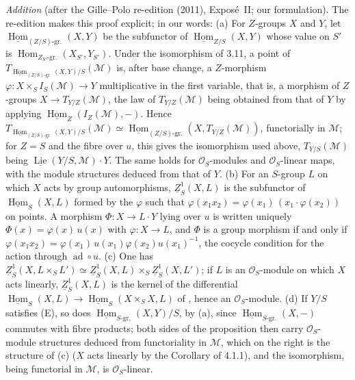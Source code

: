 \par\medskip\noindent
\emph{Addition} (after the Gille--Polo re-edition (2011), Expos\'e~II; our
formulation). The re-edition makes this proof explicit; in our words:
(a) For \(Z\)-groups \(X\) and \(Y\), let
\(\underline{\operatorname{Hom}}_{(Z/S)\text{-gr.}}(X,Y)\) be the subfunctor
of \(\underline{\operatorname{Hom}}_{Z/S}(X,Y)\) whose value on \(S'\) is
\(\operatorname{Hom}_{Z_{S'}\text{-gr.}}(X_{S'},Y_{S'})\). Under the
isomorphism of 3.11, a point of
\(T_{\underline{\operatorname{Hom}}_{(Z/S)\text{-gr.}}(X,Y)/S}(\mathcal M)\)
is, after base change, a \(Z\)-morphism
\(\varphi\colon X\times_SI_S(\mathcal M)\to Y\) multiplicative in the first
variable, that is, a morphism of \(Z\)-groups \(X\to T_{Y/Z}(\mathcal M)\),
the law of \(T_{Y/Z}(\mathcal M)\) being obtained from that of \(Y\) by
applying \(\underline{\operatorname{Hom}}_Z(I_Z(\mathcal M),-)\). Hence
\(T_{\underline{\operatorname{Hom}}_{(Z/S)\text{-gr.}}(X,Y)/S}(\mathcal M)
\simeq\underline{\operatorname{Hom}}_{(Z/S)\text{-gr.}}(X,T_{Y/Z}(\mathcal M))\),
functorially in \(\mathcal M\); for \(Z=S\) and the fibre over \(u\), this
gives the isomorphism used above, \(T_{Y/S}(\mathcal M)\) being
\(\underline{\operatorname{Lie}}(Y/S,\mathcal M)\cdot Y\). The same holds for
\(\mathcal O_S\)-modules and \(\mathcal O_S\)-linear maps, with the module
structures deduced from that of \(Y\). (b) For an \(S\)-group \(L\) on
which \(X\) acts by group automorphisms, \(\underline Z^1_S(X,L)\) is the
subfunctor of \(\underline{\operatorname{Hom}}_S(X,L)\) formed by the
\(\varphi\) such that \(\varphi(x_1x_2)=\varphi(x_1)\,(x_1\cdot\varphi(x_2))\)
on points. A morphism \(\Phi\colon X\to L\cdot Y\) lying over \(u\) is
written uniquely \(\Phi(x)=\varphi(x)\,u(x)\) with \(\varphi\colon X\to L\),
and \(\Phi\) is a group morphism if and only if
\(\varphi(x_1x_2)=\varphi(x_1)\,u(x_1)\varphi(x_2)u(x_1)^{-1}\), the cocycle
condition for the action through \(\operatorname{ad}\circ u\). (c) One has
\(\underline Z^1_S(X,L\times_SL')\simeq\underline Z^1_S(X,L)\times_S
\underline Z^1_S(X,L')\); if \(L\) is an \(\mathcal O_S\)-module on which
\(X\) acts linearly, \(\underline Z^1_S(X,L)\) is the kernel of the
differential \(\underline{\operatorname{Hom}}_S(X,L)\to
\underline{\operatorname{Hom}}_S(X\times_SX,L)\) of , hence an
\(\mathcal O_S\)-module. (d) If \(Y/S\) satisfies (E), so does
\(\underline{\operatorname{Hom}}_{S\text{-gr.}}(X,Y)/S\), by (a), since
\(\underline{\operatorname{Hom}}_{S\text{-gr.}}(X,-)\) commutes with fibre
products; both sides of the proposition then carry \(\mathcal O_S\)-module
structures deduced from functoriality in \(\mathcal M\), which on the right
is the structure of (c) (\(X\) acts linearly by the Corollary of 4.1.1), and
the isomorphism, being functorial in \(\mathcal M\), is
\(\mathcal O_S\)-linear.
\par\medskip

